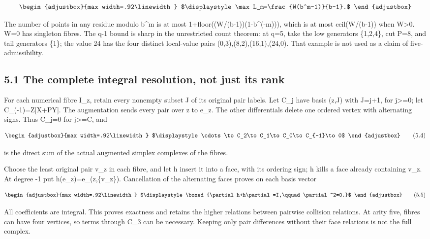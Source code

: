 \[
\begin{adjustbox}{max width=.92\linewidth}
$\displaystyle \max L_m=\frac{W(b^m-1)}{b-1}.$
\end{adjustbox}
\]

The number of points in any residue modulo b\^{}m is at most 1+floor((W/(b-1))(1-b\^{}(-m))), which is at most ceil(W/(b-1)) when W\textgreater0. W=0 has singleton fibres. The q-1 bound is sharp in the unrestricted count theorem: at q=5, take the low generators \{1,2,4\}, cut P=8, and tail generators \{1\}; the value 24 has the four distinct local-value pairs (0,3),(8,2),(16,1),(24,0). That example is not used as a claim of five-admissibility.

\subsection{5.1 The complete integral resolution, not just its rank}\label{n24-the-complete-integral-resolution-not-just-its-rank}

For each numerical fibre I\_z, retain every nonempty subset J of its original pair labels. Let C\_j have basis (z,J) with \textbar J\textbar=j+1, for j\textgreater=0; let C\_(-1)=Z{[}X+PY{]}. The augmentation sends every pair over z to e\_z. The other differentials delete one ordered vertex with alternating signs. Thus C\_j=0 for j\textgreater=C, and

\[
\begin{adjustbox}{max width=.92\linewidth}
$\displaystyle \cdots\to C_2\to C_1\to C_0\to C_{-1}\to0$
\end{adjustbox}
\tag{5.4}
\]

is the direct sum of the actual augmented simplex complexes of the fibres.

Choose the least original pair v\_z in each fibre, and let h insert it into a face, with its ordering sign; h kills a face already containing v\_z. At degree -1 put h(e\_z)=e\_(z,\{v\_z\}). Cancellation of the alternating faces proves on each basis vector

\[
\begin{adjustbox}{max width=.92\linewidth}
$\displaystyle \boxed{\partial h+h\partial=I,\qquad\partial^2=0.}$
\end{adjustbox}
\tag{5.5}
\]

All coefficients are integral. This proves exactness and retains the higher relations between pairwise collision relations. At arity five, fibres can have four vertices, so terms through C\_3 can be necessary. Keeping only pair differences without their face relations is not the full complex.

